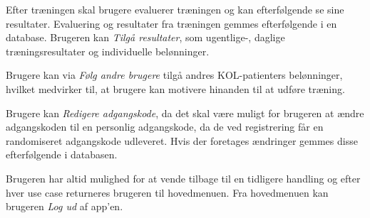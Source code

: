 Efter træningen skal brugere evaluerer træningen og kan efterfølgende se sine resultater. Evaluering og resultater fra træningen gemmes efterfølgende i en database. Brugeren kan \textit{Tilgå resultater}, som ugentlige-, daglige træningsresultater og individuelle belønninger. 

Brugere kan via \textit{Følg andre brugere} tilgå andres KOL-patienters belønninger, hvilket medvirker til, at brugere kan motivere hinanden til at udføre træning. 

Brugere kan \textit{Redigere adgangskode}, da det skal være muligt for brugeren at ændre adgangskoden til en personlig adgangskode, da de ved registrering får en randomiseret adgangskode udleveret. Hvis der foretages ændringer gemmes disse efterfølgende i databasen.

Brugeren har altid mulighed for at vende tilbage til en tidligere handling og efter hver use case returneres brugeren til hovedmenuen. Fra hovedmenuen kan brugeren \textit{Log ud} af app'en. 




